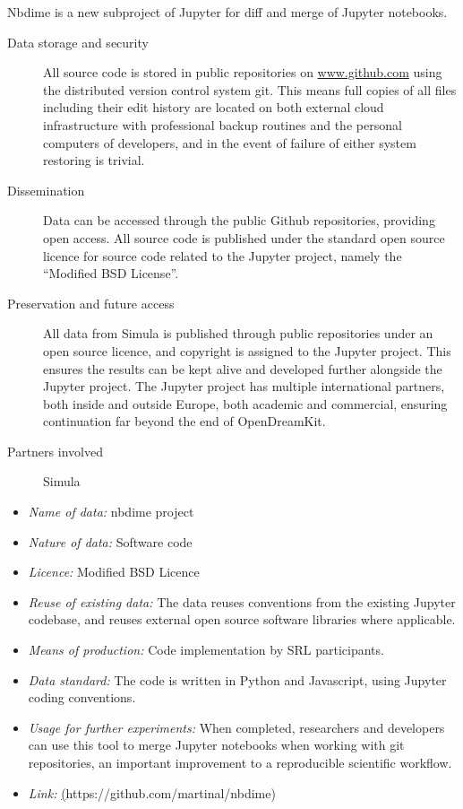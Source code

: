 \documentclass{deliverablereport}
\begin{document}
Nbdime is a new subproject of Jupyter for diff and merge of Jupyter notebooks.
\begin{description}

\item[Data storage and security] All source code is stored in public repositories on \url{www.github.com} using the distributed version control system git. This means full copies of all files including their edit history are located on both external cloud infrastructure with professional backup routines and the personal computers of developers, and in the event of failure of either system restoring is trivial.
\item[Dissemination] Data can be accessed through the public Github repositories, providing open access. All source code is published under the standard open source licence for source code related to the Jupyter project, namely the ``Modified BSD License''.
\item[Preservation and future access] All data from Simula is published through public repositories under an open source licence, and copyright is assigned to the Jupyter project. This ensures the results can be kept alive and developed further alongside the Jupyter project. The Jupyter project has multiple international partners, both inside and outside Europe, both academic and commercial, ensuring continuation far beyond the end of OpenDreamKit.
\item[Partners involved] Simula

\end{description}

\begin{itemize}
\item\textit{Name of data:} nbdime project
\item\textit{Nature of data:} Software code
\item\textit{Licence:} Modified BSD Licence
\item\textit{Reuse of existing data:} The data reuses conventions from the existing Jupyter codebase, and reuses external open source software libraries where applicable.
\item\textit{Means of production:} Code implementation by SRL participants.
\item\textit{Data standard:} The code is written in Python and Javascript, using Jupyter coding conventions.
\item\textit{Usage for further experiments:} When completed, researchers and developers can use this tool to merge Jupyter notebooks when working with git repositories, an important improvement to a reproducible scientific workflow.
\item\textit{Link:} \href{https://github.com/martinal/nbdime}(https://github.com/martinal/nbdime)
\end{itemize}
\end{document}
